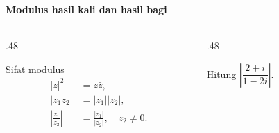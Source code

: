 \documentclass{../../kalkulus-ppt}
\begin{document}
\begin{frame}
    \frametitle{\insertsection}
    \framesubtitle{Modulus hasil kali dan hasil bagi}
    \begin{columns}[c,onlytextwidth]
        \begin{column}{.48\textwidth}
            \begin{block}{Sifat modulus}
                \[
                    \begin{aligned}
                        |z|^2&=z\bar z,\\
                        |z_1z_2|&=|z_1||z_2|,\\
                        \left|\frac{z_1}{z_2}\right|
                            &=\frac{|z_1|}{|z_2|},\quad z_2\ne0.
                    \end{aligned}
                \]
            \end{block}
        \end{column}
        \begin{column}{.48\textwidth}
            \begin{contoh}
                Hitung $\left|\dfrac{2+i}{1-2i}\right|$.
            \end{contoh}
        \end{column}
    \end{columns}
\end{frame}
\end{document}
